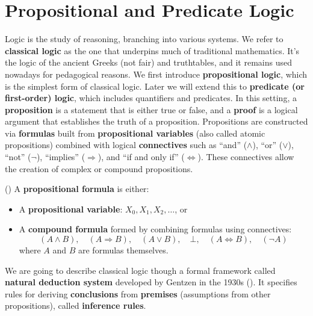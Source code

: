 
\section{Propositional and Predicate Logic}

Logic is the study of reasoning, branching into various systems.
We refer to \textbf{classical logic} as the one that underpins much 
of traditional mathematics. 
It's the logic of the ancient Greeks (not fair) and truthtables, and it remains 
used nowadays for pedagogical reasons.
We first introduce \textbf{propositional logic}, which is the simplest 
form of classical logic. 
Later we will extend this to \textbf{predicate (or first-order) logic}, which includes 
quantifiers and predicates.
In this setting, a \textbf{proposition} is a statement that is either true or false, 
and a \textbf{proof} is a logical argument that establishes the truth of a 
proposition.
Propositions are constructed via \textbf{formulas} built from 
\textbf{propositional variables} 
(also called atomic propositions) combined with logical \textbf{connectives} such as ``and'' ($\wedge$), 
``or'' ($\vee$), ``not'' ($\neg$), ``implies'' ($\Rightarrow$), and ``if and only if'' ($\Leftrightarrow$). 
These connectives allow the creation of complex or compound propositions.
\begin{definition}(\cite{thompson1999types})
A \textbf{propositional formula} is either:
\begin{itemize}
    \item A \textbf{propositional variable}: $X_0, X_1, X_2, \ldots$, or
    \item A \textbf{compound formula} formed by combining formulas using connectives:
    \[
        (A \wedge B), \quad (A \Rightarrow B), \quad (A \vee B), \quad \bot, \quad (A \Leftrightarrow B), \quad (\neg A)
    \]
    where $A$ and $B$ are formulas themselves.
\end{itemize}
\end{definition}

We are going to describe classical logic though a formal framework 
called \textbf{natural deduction system}  developed by
Gentzen in the 1930s (\cite{wadler2015propositions}). It specifies 
rules for deriving 
\textbf{conclusions} from \textbf{premises} (assumptions from other propositions), 
called \textbf{inference rules}.

